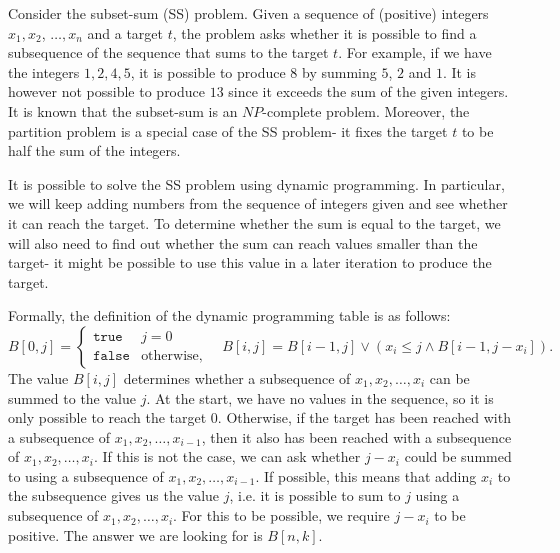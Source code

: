 \documentclass[a4paper, openany]{memoir}
\begin{document}
    Consider the subset-sum (SS) problem. Given a sequence of (positive) integers $x_1, x_2$, $\dots, x_n$ and a target $t$, the problem asks whether it is possible to find a subsequence of the sequence that sums to the target $t$. For example, if we have the integers $1, 2, 4, 5$, it is possible to produce 8 by summing $5$, $2$ and $1$. It is however not possible to produce $13$ since it exceeds the sum of the given integers. It is known that the subset-sum is an $NP$-complete problem. Moreover, the partition problem is a special case of the SS problem- it fixes the target $t$ to be half the sum of the integers.

    It is possible to solve the SS problem using dynamic programming. In particular, we will keep adding numbers from the sequence of integers given and see whether it can reach the target. To determine whether the sum is equal to the target, we will also need to find out whether the sum can reach values smaller than the target- it might be possible to use this value in a later iteration to produce the target.
    
    Formally, the definition of the dynamic programming table is as follows:
    \[B[0, j] = \begin{cases}
        \texttt{true} & j = 0 \\
        \texttt{false} & \textrm{otherwise},
    \end{cases} \quad B[i, j] = B[i-1, j] \lor (x_i \leq j \land B[i-1, j-x_i]).\]
    The value $B[i, j]$ determines whether a subsequence of $x_1, x_2, \dots, x_i$ can be summed to the value $j$. At the start, we have no values in the sequence, so it is only possible to reach the target $0$. Otherwise, if the target has been reached with a subsequence of $x_1, x_2, \dots, x_{i-1}$, then it also has been reached with a subsequence of $x_1, x_2, \dots, x_i$. If this is not the case, we can ask whether $j - x_i$ could be summed to using a subsequence of $x_1, x_2, \dots, x_{i-1}$. If possible, this means that adding $x_i$ to the subsequence gives us the value $j$, i.e. it is possible to sum to $j$ using a subsequence of $x_1, x_2, \dots, x_i$. For this to be possible, we require $j - x_i$ to be positive. The answer we are looking for is $B[n, k]$.
\end{document}
